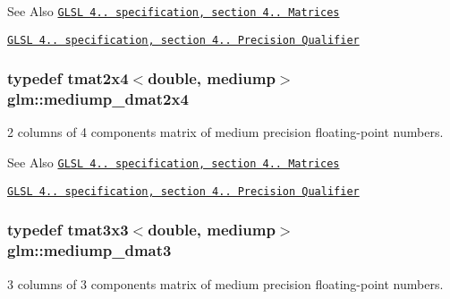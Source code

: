 \begin{DoxySeeAlso}{See Also}
\href{http://www.opengl.org/registry/doc/GLSLangSpec.4.20.8.pdf}{\tt G\-L\-S\-L 4.. specification, section 4.. Matrices} 

\href{http://www.opengl.org/registry/doc/GLSLangSpec.4.20.8.pdf}{\tt G\-L\-S\-L 4.. specification, section 4.. Precision Qualifier} 
\end{DoxySeeAlso}
\hypertarget{group__core__precision_ga837b8ead9807e10740dddfc99dabe8d7}{
\subsubsection[{mediump\-\_\-dmat2x4}]{\setlength{\rightskip}{0pt plus 5cm}typedef tmat2x4$<$double, mediump$>$ {\bf glm\-::mediump\-\_\-dmat2x4}}}\label{group__core__precision_ga837b8ead9807e10740dddfc99dabe8d7}
2 columns of 4 components matrix of medium precision floating-\/point numbers.

\begin{DoxySeeAlso}{See Also}
\href{http://www.opengl.org/registry/doc/GLSLangSpec.4.20.8.pdf}{\tt G\-L\-S\-L 4.. specification, section 4.. Matrices} 

\href{http://www.opengl.org/registry/doc/GLSLangSpec.4.20.8.pdf}{\tt G\-L\-S\-L 4.. specification, section 4.. Precision Qualifier} 
\end{DoxySeeAlso}
\hypertarget{group__core__precision_ga1a9a878d256cbb899a9c10bc7332995a}{
\subsubsection[{mediump\-\_\-dmat3}]{\setlength{\rightskip}{0pt plus 5cm}typedef tmat3x3$<$double, mediump$>$ {\bf glm\-::mediump\-\_\-dmat3}}}\label{group__core__precision_ga1a9a878d256cbb899a9c10bc7332995a}
3 columns of 3 components matrix of medium precision floating-\/point numbers.

